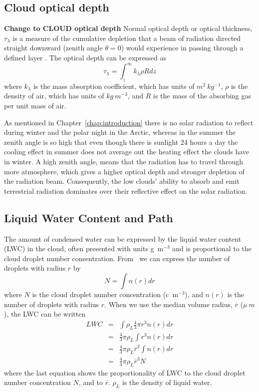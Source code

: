 \subsection{Cloud optical depth}
\textbf{Change to CLOUD optical depth}
Normal optical depth or optical thickness, $\tau_{\lambda}$ is a measure of the cumulative depletion that a beam of radiation directed straight downward (zenith angle $\theta = 0$) would experience in passing through a defined layer \citep{Wallace2006}. The optical depth can be expressed as
\begin{equation}
\tau_{\lambda} = \int_z^{\infty} k_{\lambda} \rho R dz
\end{equation}
where $k_{\lambda}$ is the mass absorption coefficient, which has units of $m^2~kg^{-1}$, $\rho$ is the density of air, which has units of $kg~m^{-3}$, and $R$ is the mass of the absorbing gas per unit mass of air.

As mentioned in Chapter~\ref{chap:introduction} there is no solar radiation to reflect during winter and the polar night in the Arctic, whereas in the summer the zenith angle is so high that even though there is sunlight 24 hours a day the cooling effect in summer does not average out the heating effect the clouds have in winter. A high zenith angle, means that the radiation has to travel through more atmosphere, which gives a higher optical depth and stronger depletion of the radiation beam. Consequently, the low clouds' ability to absorb and emit terrestrial radiation dominates over their reflective effect on the solar radiation.

\subsection{Liquid Water Content and Path}
 The amount of condensed water can be expressed by the liquid water content (LWC) in the cloud, often presented with units g~m$^{-3}$ and is proportional to the cloud droplet number consentration. From~\citet{Rogers1989} we can express the number of droplets with radius $r$ by
\begin{equation}
N = \int n(r) dr
\end{equation}
where $N$ is the cloud droplet number concentration (c~m$^{-3}$), and $n(r)$ is the number of droplets with radius $r$. When we use the median volume radius, $\overline{r}$ ($\mu~m$), the LWC can be written
\begin{eqnarray}
LWC &=& \int \rho_L \frac{4}{3} \pi r^3 n(r) dr\\
&=& \frac{4}{3} \pi \rho_L \int r^3 n(r) dr\\
&=& \frac{4}{3} \pi \rho_L \overline{r}^3 \int n(r) dr\\
&=& \frac{4}{3} \pi \rho_L \overline{r}^3 N 
\end{eqnarray}
where the last equation shows the proportionality of LWC to the cloud droplet number concentration $N$, and to $\overline{r}$. $\rho_L$ is the density of liquid water.

